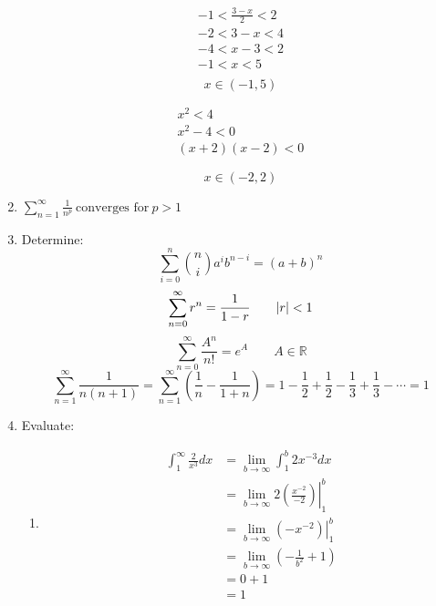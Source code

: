 \documentclass[letterpaper,12pt,fleqn]{article}
\begin{document}
\begin{enumerate}
  \begin{minipage}{3.25in}
    \begin{gather*}
      -1 < \frac{3-x}{2} < 2 \\
      -2 < 3-x < 4 \\
      -4 < x-3 < 2 \\
      -1 < x < 5 \\
    \end{gather*}
    \[x\in(-1,5)\]
  \end{minipage}
  \begin{minipage}{3.25in}
    \begin{gather*}
      x^2 < 4 \\
      x^2-4 < 0 \\
      (x+2)(x-2) < 0
    \end{gather*}
    \[x\in(-2,2)\]
  \end{minipage}

\item \(\displaystyle\sum_{n=1}^\infty\frac{1}{n^p}\ \text{converges for}\ p>1\)

\item Determine:
  \[\sum_{i=0}^n\binom{n}{i}a^ib^{n-i}=(a+b)^n\]
  \[\sum_{n=0}^\infty r^n=\frac{1}{1-r}\qquad \lvert r\rvert<1\]
  \[\sum_{n=0}^\infty\frac{A^n}{n!}=e^A\qquad A\in\mathbb{R}\]
  \[\sum_{n=1}^\infty\frac{1}{n(n+1)}=\sum_{n=1}^\infty\left(\frac{1}{n}-\frac{1}{1+n}\right)=1-\frac{1}{2}+\frac{1}{2}-
  \frac{1}{3}+\frac{1}{3}-\cdots=1\]

\item Evaluate:
  \begin{enumerate}
  \item
    \begin{align*}
      \int_1^\infty\frac{2}{x^3}dx &= \lim_{b\to\infty}\int_1^b2x^{-3}dx \\
      &= \lim_{b\to\infty}2\left.\left(\frac{x^{-2}}{-2}\right)\right\rvert_1^b \\
      &= \lim_{b\to\infty}\left(-\left.x^{-2}\right)\right\rvert_1^b \\
      &= \lim_{b\to\infty}\left(-\frac{1}{b^2}+1\right) \\
      &= 0 + 1 \\
      &= 1
    \end{align*}


\end{enumerate}
\end{enumerate}
\end{document}

